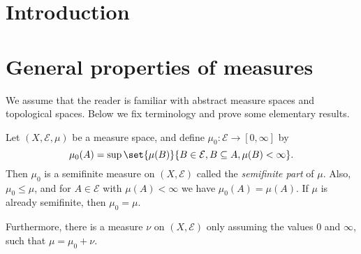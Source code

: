 \documentclass[article, a4paper, 11pt, oneside]{memoir}
\title{\doctitle}
\author{\docauthor}
\numberwithin{equation}{chapter}
\newcommand{\calE}{\mathcal{E}}
\begin{document}
\maketitle

\chapter{Introduction}


\chapter{General properties of measures}

We assume that the reader is familiar with abstract measure spaces and topological spaces. Below we fix terminology and prove some elementary results.


\begin{proposition}
    \label{prop:semifinite-part}
    Let $(X,\calE,\mu)$ be a measure space, and define $\mu_0 \colon \calE \to [0,\infty]$ by
    \begin{equation*}
        \mu_0(A)
            = \sup \set{\mu(B)}{B \in \calE, B \subseteq A, \mu(B) < \infty}.
    \end{equation*}
    Then $\mu_0$ is a semifinite measure on $(X,\calE)$ called the \emph{semifinite part} of $\mu$. Also, $\mu_0 \leq \mu$, and for $A \in \calE$ with $\mu(A) < \infty$ we have $\mu_0(A) = \mu(A)$. If $\mu$ is already semifinite, then $\mu_0 = \mu$.

    Furthermore, there is a measure $\nu$ on $(X,\calE)$ only assuming the values $0$ and $\infty$, such that $\mu = \mu_0 + \nu$.
\end{proposition}
\end{document}
